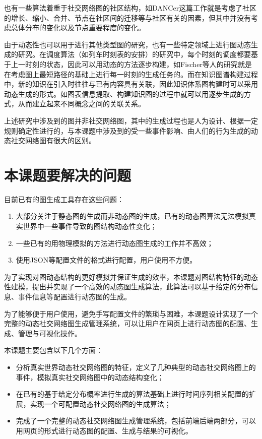 也有一些算法着重于社交网络图的社区结构，如DANCer\cite{DANCer}这篇工作就是考虑了社区的增长、缩小、合并、节点在社区间的迁移等与社区有关的因素，但其中并没有考虑总体分布的变化以及节点重要程度的变化。

由于动态性也可以用于进行其他类型图的研究，也有一些特定领域上进行图动态生成的研究。在调度算法（如列车时刻表的安排）的研究中，每个时刻的调度都要基于上一时刻的状态，因此可以用动态的方法逐步构建，如Fischer等人的研究\cite{Fischer2011Dynamic}就是在考虑图上最短路径的基础上进行每一时刻的生成任务的。而在知识图谱构建过程中，新的知识在引入时往往与已有内容具有关联，因此知识体系图构建时可以采用动态生成的形式。如图表信息提取、构建知识图的过程中就可以用逐步生成的方式\cite{Kim2017Dynamic}，从而建立起来不同概念之间的关联关系。

上述研究中涉及到的图并非社交网络图，其中的生成过程也是人为设计、根据一定规则确定性进行的，与本课题中涉及到的受一些事件影响、由人们的行为生成的动态社交网络图有很大的区别。

\section{本课题要解决的问题}
\label{content:problem}

目前已有的图生成工具存在这些问题：

\begin{enumerate}
  \item 大部分关注于静态图的生成而非动态图的生成，已有的动态图算法无法模拟真实世界中一些事件导致的图结构动态性变化；
  \item 一些已有的用物理模拟的方法\cite{De2014Dynamic}进行动态图生成的工作并不高效；
  \item 使用JSON等配置文件的格式进行配置\cite{FastSGG}，用户使用不方便。
\end{enumerate}

\vspace{0.2cm}

为了实现对图动态结构的更好模拟并保证生成的效率，本课题对图结构特征的动态性建模，提出并实现了一个高效的动态图生成算法，此算法可以基于给定的分布信息、事件信息等配置进行动态图的生成。

为了能够便于用户使用，避免手写配置文件的繁琐与困难，本课题设计实现了一个完整的动态社交网络图生成管理系统，可以让用户在网页上进行动态图的配置、生成、管理与可视化操作。

本课题主要包含以下几个方面：

\begin{itemize}
  \item 分析真实世界动态社交网络图的特征，定义了几种典型的动态社交网络图上的事件，模拟真实社交网络图中的动态结构变化；
  \item 在已有的基于给定分布概率进行生成的算法\cite{FastSGG}基础上进行时间序列相关配置的扩展，实现一个可配置动态社交网络图的生成算法；
  \item 完成了一个完整的动态社交网络图生成管理系统，包括前端后端两部分，可以用网页的形式进行动态图的配置、生成与结果的可视化。
\end{itemize}
